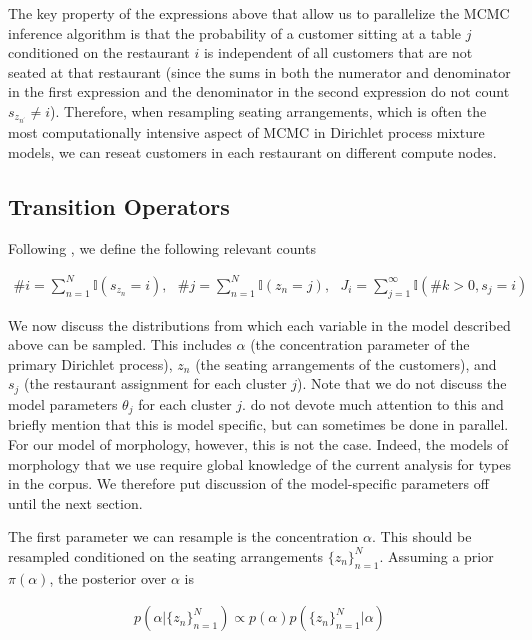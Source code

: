 \documentclass{article}
\begin{document}
The key property of the expressions above that allow us to parallelize
the MCMC inference algorithm is that the probability of a customer
sitting at a table $j$ conditioned on the restaurant $i$ is
independent of all customers that are not seated at that restaurant
(since the sums in both the numerator and denominator in the first
expression and the denominator in the second expression do not count
$s_{z_{n^\prime}} \neq i$). Therefore, when resampling seating
arrangements, which is often the most computationally intensive aspect
of MCMC in Dirichlet process mixture models, we can reseat customers
in each restaurant on different compute nodes.

\subsection{Transition Operators}
\label{sec:parallel-transition-operators}

Following \cite{lovell2012}, we define the following relevant counts

\begin{align*}
  \#i = \sum_{n=1}^N \mathbb{I}(s_{z_n} = i),\text{ }
  \#j = \sum_{n=1}^N \mathbb{I}(z_n = j),\text{ }
  J_i = \sum_{j=1}^\infty \mathbb{I}(\#k > 0, s_j = i)
\end{align*}

We now discuss the distributions from which each variable in the model
described above can be sampled. This includes $\alpha$ (the
concentration parameter of the primary Dirichlet process), $z_n$ (the
seating arrangements of the customers), and $s_j$ (the restaurant
assignment for each cluster $j$). Note that we do not discuss the
model parameters $\theta_j$ for each cluster $j$. \cite{lovell2012} do
not devote much attention to this and briefly mention that this is
model specific, but can sometimes be done in parallel. For our model
of morphology, however, this is not the case. Indeed, the models of
morphology that we use require global knowledge of the current
analysis for types in the corpus. We therefore put discussion of the
model-specific parameters off until the next section.

The first parameter we can resample is the concentration
$\alpha$. This should be resampled conditioned on the seating
arrangements $\{z_n\}_{n=1}^N$. Assuming a prior $\pi(\alpha)$, the
posterior over $\alpha$ is

\begin{align}
  p(\alpha | \{z_n\}_{n=1}^N) \propto p(\alpha) p(\{z_n\}_{n=1}^N | \alpha)
\end{align}
\end{document}
